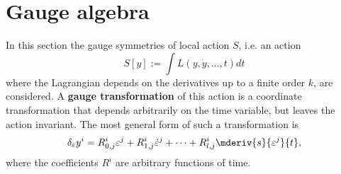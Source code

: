\section{Gauge algebra}

    In this section the gauge symmetries of local action $S$, i.e. an action \[S[y] := \int L(y,\dot{y},\ldots,t) dt\] where the Lagrangian depends on the derivatives up to a finite order $k$, are considered. A \textbf{gauge transformation} of this action is a coordinate transformation that depends arbitrarily on the time variable, but leaves the action invariant. The most general form of such a transformation is
    \begin{gather}
        \label{lagrange:gauge_trasnformation}
        \delta_\varepsilon y^i = R^i_{0,j}\varepsilon^j + R^i_{1,j}\dot{\varepsilon}^j + \cdots + R^i_{l,j}\mderiv{s}{\varepsilon^j}{t},
    \end{gather}
    where the coefficients $R^i$ are arbitrary functions of time.

